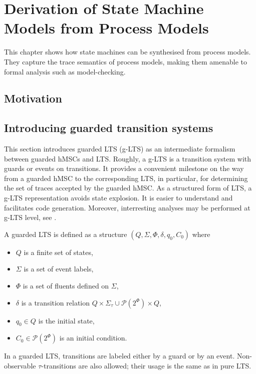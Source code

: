 \chapter{Derivation of State Machine Models from Process Models\label{chapter:deductive}}

This chapter shows how state machines can be synthesised from process models. They capture the trace semantics of process models, making them amenable to formal analysis such as model-checking.

\section{Motivation}

\section{Introducing guarded transition systems}

This section introduces guarded LTS (g-LTS) as an intermediate formalism between guarded hMSCs and LTS. Roughly, a g-LTS is a transition system with guards or events on transitions. It provides a convenient milestone on the way from a guarded hMSC to the corresponding LTS, in particular, for determining the set of traces accepted by the guarded hMSC. As a structured form of LTS, a g-LTS representation avoids state explosion. It is easier to understand and facilitates code generation. Moreover, interresting analyses may be performed at g-LTS level, see \cite{Damas:2011}.

\begin{definition}
\noindent A guarded LTS is defined as a structure $(Q,\Sigma,\Phi,\delta,q_{0},C_{0})$ where 
\begin{itemize}
\item $Q$ is a finite set of states,
\item $\Sigma$ is a set of event labels, 
\item $\Phi$ is a set of fluents defined on $\Sigma$,
\item $\delta$ is a transition relation $Q \times \Sigma_{\tau}\cup\mathcal{P}(2^\Phi) \times Q$,
\item $q_{0} \in Q$ is the initial state,
\item $C_{0} \in \mathcal{P}(2^\Phi)$ is an initial condition. 
\end{itemize}
\end{definition}

In a guarded LTS, transitions are labeled either by a guard or by an event. Non-observable $\tau$-transitions are also allowed; their usage is the same as in pure LTS. 


